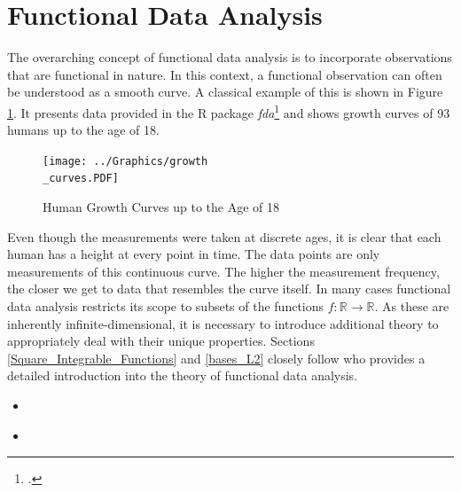 \documentclass[12pt, a4paper]{article}
\theoremstyle{MAstyle} \newtheorem{assumption}{Assumption}[section]
\theoremstyle{MAstyle} \newtheorem{definition}{Definition}[section]
\begin{document}
	\section{Functional Data Analysis}\label{FDA}
		The overarching concept of functional data analysis is to incorporate observations that are functional in nature. In this context, a functional observation can often be understood as a smooth curve. A classical example of this is shown in Figure \ref{growth_curves}. It presents data provided in the R package \textit{fda}\footcite{fda} and shows growth curves of 93 humans up to the age of 18.
		\begin{figure}[H]
			\texttt{[image: ../Graphics/growth\\\_curves.PDF]}
			\caption{Human Growth Curves up to the Age of 18}
			\label{growth_curves}
		\end{figure}
		Even though the measurements were taken at discrete ages, it is clear that each human has a height at every point in time. The data points are only measurements of this continuous curve. The higher the measurement frequency, the closer we get to data that resembles the curve itself.
		In many cases functional data analysis restricts its scope to subsets of the functions $f:\mathbb{R} \rightarrow \mathbb{R}$.
		As these are inherently infinite-dimensional, it is necessary to introduce additional theory to appropriately deal with their unique properties. Sections \ref{Square_Integrable_Functions} and \ref{bases_L2} closely follow \cite{hsing_theoretical_2015} who provides a detailed introduction into the theory of functional data analysis.
		
		\begin{itemize}
			\item \cite{ramsay_functional_2005}
			\item \cite{kokoszka_introduction_2021}
		\end{itemize}
	
\end{document}
